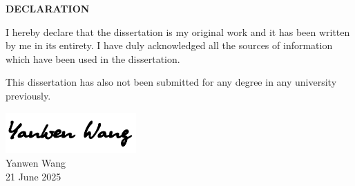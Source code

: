 \begin{center}
    {\large \textbf{DECLARATION}}
\end{center}

\vspace{3cm}

\begin{center}
    I hereby declare that the dissertation is my original work and it has
    been written by me in its entirety. I have duly
    acknowledged all the sources of information which have
    been used in the dissertation.

    \vspace{1cm}

    This dissertation has also not been submitted for any degree in any
    university previously.

    \vspace{4cm}

    \includegraphics[width=5cm]{misc./signature.png}\\[0.5cm]
    Yanwen Wang\\
    21 June 2025
\end{center}

\thispagestyle{plain}
\clearpage